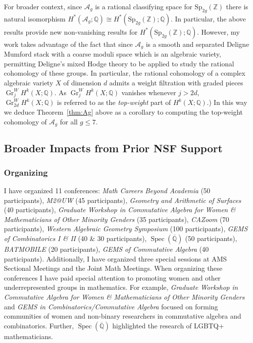 \documentclass[11pt,reqno]{amsart}
\theoremstyle{remark}
\newcommand{\Spec}{\operatorname{Spec}}
\newcommand{\Gr}{\operatorname{Gr}}
\newcommand{\QQ}{\mathbb{Q}}
\newcommand{\ZZ}{\mathbb{Z}}
\newcommand{\cA}{\mathcal{A}}
\begin{document}
For broader context, since $\cA_g$ is a rational classifying space for $\mathrm{Sp}_{2g}(\ZZ)$ there is natural isomorphism $H^*(\cA_g;\QQ) \cong H^*(\mathrm{Sp}_{2g}(\ZZ);\QQ)$. In particular, the above results provide new non-vanishing results for $H^*(\mathrm{Sp}_{2g}(\ZZ);\QQ)$. However, my work takes advantage of the fact that since $\cA_g$  is a smooth and separated Deligne Mumford stack with a coarse moduli space which is an algebraic variety, permitting Deligne's mixed Hodge theory to be applied to study the rational cohomology of these groups. In particular, the rational cohomology of a %
complex algebraic variety $X$ of dimension $d$ admits a weight filtration with graded pieces $\Gr_{j}^W\!H^k(X;\mathbb{Q})$. %
As $\Gr_{j}^W\!H^k(X;\mathbb{Q})$ vanishes whenever $j>2d$, $\Gr_{2d}^W\!H^k(X;\mathbb{Q})$ is referred to as the {\em top-weight} part of $H^k(X;\QQ)$.)  In this way we deduce Theorem~\ref{thm:Ag} above as a corollary to computing the top-weight cohomology of $\cA_{g}$ for all $g\leq 7$.  

\subsection{Broader Impacts from Prior NSF Support}

\subsubsection{Organizing}\label{subsubsec:prior-organizing} I have organized 11 conferences: \textit{Math Careers Beyond Academia } (50 participants), \textit{M2@UW} (45 participants), \textit{Geometry and Arithmetic of Surfaces} (40 participants), \textit{Graduate Workshop in Commutative Algebra for Women \& Mathematicians of Other Minority Genders} (35 participants), \textit{CAZoom} (70 participants), \textit{Western Algebraic Geometry Symposium} (100 participants), \textit{GEMS of Combinatorics I \& II} (40 \& 30 participants), $\Spec(\overline{\QQ})$ (50 participants), \textit{BATMOBILE} (20 participants),  \textit{GEMS of Commutative Algebra} (40 participants). Additionally, I have organized three special sessions at AMS Sectional Meetings and the Joint Math Meetings. When organizing these conferences I have paid special attention to promoting women and other underrepresented groups in mathematics. For example, \textit{Graduate Workshop in Commutative Algebra for Women \& Mathematicians of Other Minority Genders} and \textit{GEMS in Combinatorics/Commutative Algebra}  focused on forming communities of women and non-binary researchers in commutative algebra and combinatorics. Further, $\Spec(\overline{\QQ})$ highlighted the research of LGBTQ+ mathematicians.
\end{document}
